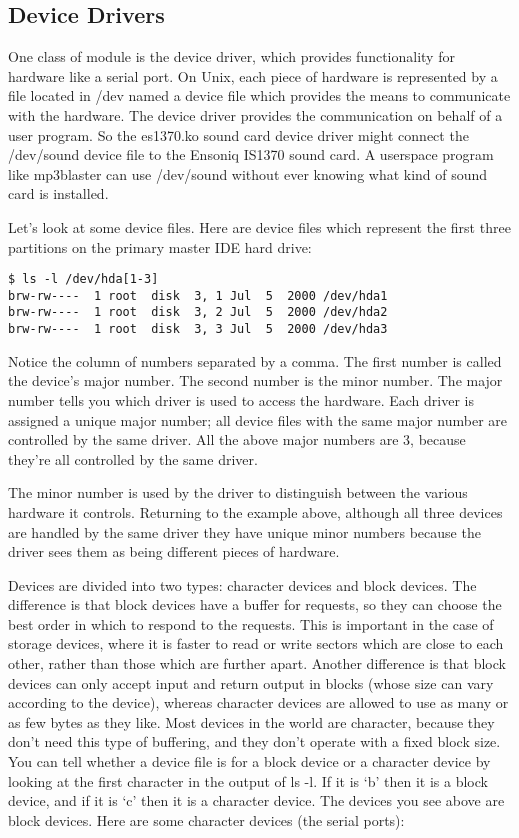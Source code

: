 \documentclass[10pt, oneside]{book}
\begin{document}
\subsection{Device Drivers}
\label{sec:device_drivers}
One class of module is the device driver, which provides functionality for hardware like a serial port.
On Unix, each piece of hardware is represented by a file located in /dev named a device file which provides the means to communicate with the hardware.
The device driver provides the communication on behalf of a user program.
So the es1370.ko sound card device driver might connect the /dev/sound device file to the Ensoniq IS1370 sound card.
A userspace program like mp3blaster can use /dev/sound without ever knowing what kind of sound card is installed.

Let's look at some device files.
Here are device files which represent the first three partitions on the primary master IDE hard drive:

\begin{verbatim}
$ ls -l /dev/hda[1-3]
brw-rw----  1 root  disk  3, 1 Jul  5  2000 /dev/hda1
brw-rw----  1 root  disk  3, 2 Jul  5  2000 /dev/hda2
brw-rw----  1 root  disk  3, 3 Jul  5  2000 /dev/hda3
\end{verbatim}

Notice the column of numbers separated by a comma.
The first number is called the device's major number.
The second number is the minor number. The major number tells you which driver is used to access the hardware.
Each driver is assigned a unique major number; all device files with the same major number are controlled by the same driver.
All the above major numbers are 3, because they're all controlled by the same driver.

The minor number is used by the driver to distinguish between the various hardware it controls.
Returning to the example above, although all three devices are handled by the same driver they have unique minor numbers because the driver sees them as being different pieces of hardware.

Devices are divided into two types: character devices and block devices.
The difference is that block devices have a buffer for requests, so they can choose the best order in which to respond to the requests.
This is important in the case of storage devices, where it is faster to read or write sectors which are close to each other, rather than those which are further apart.
Another difference is that block devices can only accept input and return output in blocks (whose size can vary according to the device), whereas character devices are allowed to use as many or as few bytes as they like.
Most devices in the world are character, because they don't need this type of buffering, and they don't operate with a fixed block size.
You can tell whether a device file is for a block device or a character device by looking at the first character in the output of ls -l.
If it is `b' then it is a block device, and if it is `c' then it is a character device.
The devices you see above are block devices. Here are some character devices (the serial ports):
\end{document}

